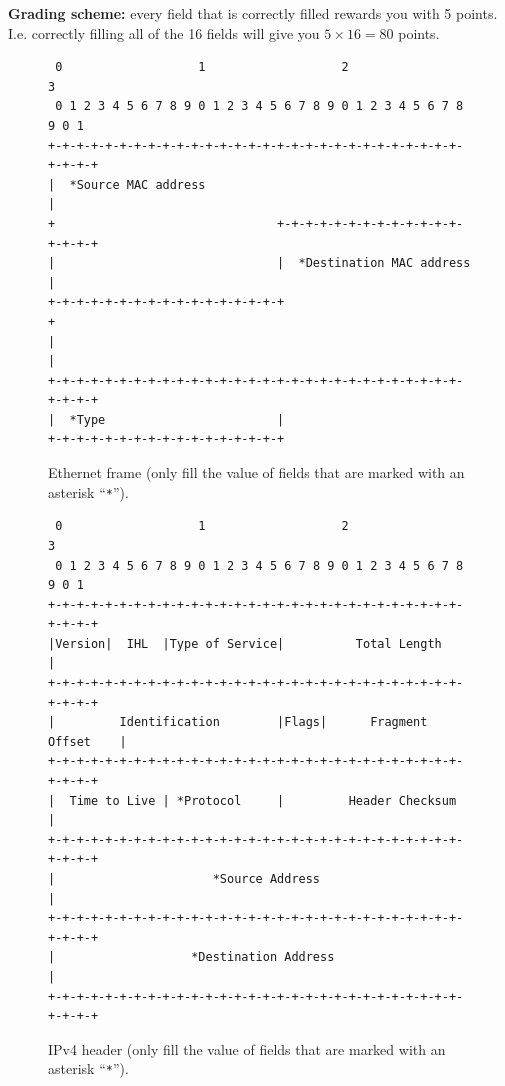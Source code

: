 \documentclass[pdftex,12pt,a4paper]{article}
\begin{document}
       \textbf{Grading scheme:} every field that is correctly filled rewards
       you with 5 points. I.e. correctly filling all of the 16 fields will
       give you $5 \times 16 = 80$ points.

        \begin{figure}[!h]
        \centering
        \small\begin{verbatim} 0                   1                   2                   3
 0 1 2 3 4 5 6 7 8 9 0 1 2 3 4 5 6 7 8 9 0 1 2 3 4 5 6 7 8 9 0 1
+-+-+-+-+-+-+-+-+-+-+-+-+-+-+-+-+-+-+-+-+-+-+-+-+-+-+-+-+-+-+-+-+
|  *Source MAC address                                          |
+                               +-+-+-+-+-+-+-+-+-+-+-+-+-+-+-+-+
|                               |  *Destination MAC address     |
+-+-+-+-+-+-+-+-+-+-+-+-+-+-+-+-+                               +
|                                                               |
+-+-+-+-+-+-+-+-+-+-+-+-+-+-+-+-+-+-+-+-+-+-+-+-+-+-+-+-+-+-+-+-+
|  *Type                        |                               
+-+-+-+-+-+-+-+-+-+-+-+-+-+-+-+-+\end{verbatim}\normalsize
        \vspace{-15pt}
        \caption{Ethernet frame (only fill the value of fields that are marked
        with an asterisk ``\texttt{*}'').}
        \label{fig:eth}
        \end{figure}

        \begin{figure}[!h]
        \centering
        \small\begin{verbatim} 0                   1                   2                   3
 0 1 2 3 4 5 6 7 8 9 0 1 2 3 4 5 6 7 8 9 0 1 2 3 4 5 6 7 8 9 0 1
+-+-+-+-+-+-+-+-+-+-+-+-+-+-+-+-+-+-+-+-+-+-+-+-+-+-+-+-+-+-+-+-+
|Version|  IHL  |Type of Service|          Total Length         |
+-+-+-+-+-+-+-+-+-+-+-+-+-+-+-+-+-+-+-+-+-+-+-+-+-+-+-+-+-+-+-+-+
|         Identification        |Flags|      Fragment Offset    |
+-+-+-+-+-+-+-+-+-+-+-+-+-+-+-+-+-+-+-+-+-+-+-+-+-+-+-+-+-+-+-+-+
|  Time to Live | *Protocol     |         Header Checksum       |
+-+-+-+-+-+-+-+-+-+-+-+-+-+-+-+-+-+-+-+-+-+-+-+-+-+-+-+-+-+-+-+-+
|                      *Source Address                          |
+-+-+-+-+-+-+-+-+-+-+-+-+-+-+-+-+-+-+-+-+-+-+-+-+-+-+-+-+-+-+-+-+
|                   *Destination Address                        |
+-+-+-+-+-+-+-+-+-+-+-+-+-+-+-+-+-+-+-+-+-+-+-+-+-+-+-+-+-+-+-+-+\end{verbatim}\normalsize
        \vspace{-15pt}
        \caption{IPv4 header (only fill the value of fields that are marked
        with an asterisk ``\texttt{*}'').}
        \label{fig:ipv4}
        \end{figure}
\end{document}
